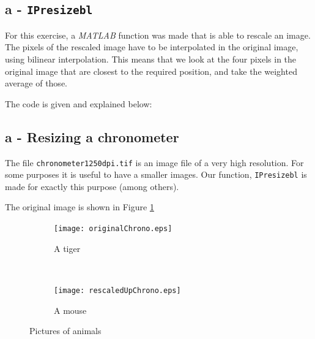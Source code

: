 \subsection*{a - \texttt{IPresizebl}}
For this exercise, a \textit{MATLAB} function was made that is able to rescale an image.
The pixels of the rescaled image have to be interpolated in the original image, using bilinear interpolation.
This means that we look at the four pixels in the original image that are closest to the required position, and take the weighted average of those.

The code is given and explained below:

\subsection*{a - Resizing a chronometer}
The file \texttt{chronometer1250dpi.tif} is an image file of a very high resolution.
For some purposes it is useful to have a smaller images.
Our function, \texttt{IPresizebl} is made for exactly this purpose (among others).

The original image is shown in Figure \ref{fig:tiger}

\begin{figure}
\centering
\begin{subfigure}[b]{0.4\textwidth}
\texttt{[image: originalChrono.eps]}
\caption{A tiger}
\label{fig:tiger}
\end{subfigure}
~
\begin{subfigure}[b]{0.4\textwidth}
\texttt{[image: rescaledUpChrono.eps]}
\caption{A mouse}
\label{fig:mouse}
\end{subfigure}
\caption{Pictures of animals}\label{fig:animals}
\end{figure}

